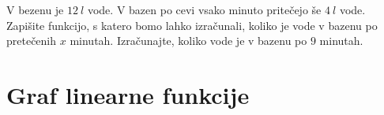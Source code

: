             \begin{naloga}
                V bezenu je $12~l$ vode. V bazen po cevi vsako minuto pritečejo še $4~l$ vode.
                Zapišite funkcijo, s katero bomo lahko izračunali, koliko je vode v bazenu po pretečenih $x$ minutah.
                Izračunajte, koliko vode je v bazenu po $9$ minutah. 
            \end{naloga}


        











\newpage
    \section{Graf linearne funkcije}


